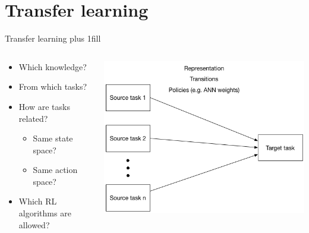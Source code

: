 \section{Transfer learning}
\begin{frame}[fragile]{Transfer learning}
\vskip0pt plus 1fill
\begin{columns}
\begin{column}{0.4\textwidth}
\begin{itemize}
    \item Which knowledge?
    \item From which tasks?
    \item How are tasks related?
    \begin{itemize}
        \item Same state space?
        \item Same action space?
    \end{itemize}
    \item Which RL algorithms are allowed?
\end{itemize}
\end{column}
    \begin{column}{0.6\textwidth}
    \includegraphics[width=\linewidth]{transfer_learning}
    \end{column}
\end{columns}
\begin{center}
\end{center}
\end{frame}

